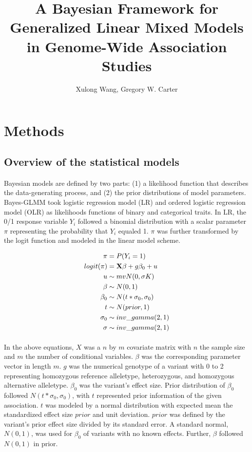 \documentclass[12pt]{article}
\title{A Bayesian Framework for Generalized Linear Mixed Models in Genome-Wide Association Studies}
\author{Xulong Wang, Gregory W. Carter}
\begin{document}
\maketitle

\section*{Methods}
\subsection*{Overview of the statistical models}

\paragraph{}{
Bayesian models are defined by two parts: (1) a likelihood function that describes the data-generating process, and (2) the prior distributions of model parameters. Bayes-GLMM took logistic regression model (LR) and ordered logistic regression model (OLR) as likelihoods functions of binary and categorical traits. In LR, the 0/1 response variable $Y_i$ followed a binomial distribution with a scalar parameter $\pi$ representing the probability that $Y_i$ equaled 1. $\pi$ was further transformed by the logit function and modeled in the linear model scheme. 
}

\begin{align}
   \pi & = P(Y_i = 1) \\
   logit(\pi) & = \bold{X} \beta + g \beta_0 + u \\
    u & \sim mvN(0, \sigma K) \\
   \beta & \sim N(0, 1) \\
   \beta_0 & \sim N( t * \sigma_0, \sigma_0) \\
   t & \sim N(prior, 1) \\
   \sigma_0 & \sim inv\_gamma(2, 1) \\ 
   \sigma & \sim inv\_gamma(2, 1)
\end{align}

\paragraph{}{
In the above equations, $X$ was a $n$ by $m$ covariate matrix with $n$ the sample size and $m$ the number of conditional variables. $\beta$ was the corresponding parameter vector in length $m$. $g$ was the numerical genotype of a variant with 0 to 2 representing homozygous reference alleletype, heterozygous, and homozygous alternative alleletype. $\beta_0$ was the variant's effect size. Prior distribution of $\beta_0$ followed $N(t * \sigma_0, \sigma_0)$, with $t$ represented prior information of the given association. $t$ was modeled by a normal distribution with expected mean the standardized effect size $prior$ and unit deviation. $prior$ was defined by the variant's prior effect size divided by its standard error. A standard normal, $N(0, 1)$, was used for $\beta_0$ of variants with no known effects. Further, $\beta$ followed $N(0, 1)$ in prior.
}
\end{document}
